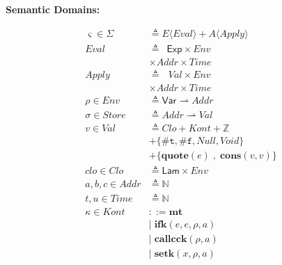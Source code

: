 \documentclass[12pt,draft]{article}
\newcommand{\truesyn}{\texttt{\#t}}
\newcommand{\falsesyn}{\texttt{\#f}}
\begin{document}
\begin{multicols*}{2}
\vfill\null
\columnbreak


\begin{center}
\textbf{Semantic Domains:}
\end{center}
\vspace{-18mm}
\begin{center}
\begin{align*}
\varsigma \in \Sigma &\triangleq E\langle\textit{Eval}\rangle 
								+ A\langle\textit{Apply}\rangle \\
\textit{Eval} &\triangleq \:\;\textsf{Exp} \times \textit{Env} \\
						& \times \textit{Addr} \times \textit{Time} \\
\textit{Apply} &\triangleq \:\;\,\textit{Val} \times \textit{Env} \\
						& \times \textit{Addr} \times \textit{Time} \\
\rho \in \textit{Env} &\triangleq \textsf{Var} \rightharpoonup 
												\textit{Addr} \\
\sigma \in \textit{Store} &\triangleq \textit{Addr} \rightharpoonup
													\textit{Val} \\
v \in \textit{Val} &\triangleq \textit{Clo} + \textit{Kont} + \mathbb{Z} \\
				&+ \{ \truesyn,\falsesyn, \textit{Null} , \textit{Void} \} \\
				&+ \{\textbf{quote}(e) \;,\; \textbf{cons}(v, v)\} \\
clo \in \textit{Clo} &\triangleq \textsf{Lam} \times \textit{Env} \\
a,b,c \in \textit{Addr} &\triangleq \mathbb{N} \\
t,u \in \textit{Time} &\triangleq \mathbb{N} \\
\kappa \in \textit{Kont} &::= \textbf{mt} \\
        &|\; \textbf{ifk}(e, e, \rho, a) \\
        &|\; \textbf{callcck}(\rho, a) \\
        &|\; \textbf{setk}(x, \rho, a) \\

\end{align*}
\end{center}
\end{multicols*}
\end{document}
